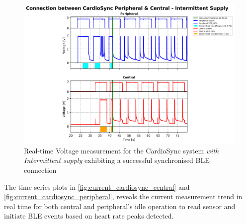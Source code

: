 \begin{figure}[H]
    \centering
    \includegraphics[width=0.95\linewidth]{chapters/Results/Connection_cardiosync_intermittent.png}
    \caption{Real-time Voltage measurement for the CardioSync system \textit{with Intermittent supply} exhibiting a successful synchronised BLE connection}
    \label{fig:intermittent_connection_cardiosync}
\end{figure}

\noindent The time series plots in \autoref{fig:current_cardiosync_central} and \autoref{fig:current_cardiosync_peripheral}, reveals the current measurement trend in real time for both central and peripheral's idle operation to read sensor and initiate BLE events based on heart rate peaks detected.

